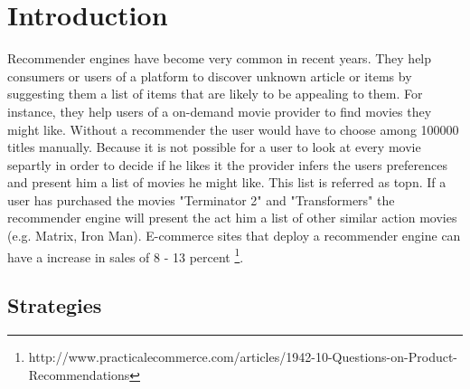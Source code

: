 \section{Introduction}
\label{sec:intro}

Recommender engines have become very common in recent years. They help consumers or users of a platform to discover unknown article or items by suggesting them a list of items that are likely to be appealing to them. 
For instance, they help users of a on-demand movie provider to find movies they might like. Without a recommender the user would have to choose among 100000 titles manually. Because it is not possible for a user to look at every movie separtly in order to decide if he likes it the provider infers the users preferences and present him a list of movies he might like. This list is referred as \gls{topn}. If a user has purchased the movies "Terminator 2" and "Transformers" the recommender engine will present the act him a list of other similar action movies (e.g. Matrix, Iron Man).
E-commerce sites that deploy a recommender engine can have a increase in sales of 8 - 13 percent \footnote{http://www.practicalecommerce.com/articles/1942-10-Questions-on-Product-Recommendations}.

\subsection{Strategies}
\label{sec:strategies}

